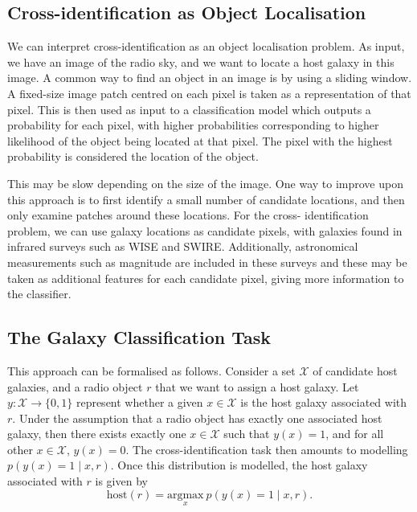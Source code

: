   \subsection{Cross-identification as Object Localisation}
  \label{sec:object-localisation}

    We can interpret cross-identification as an object localisation problem. As
    input, we have an image of the radio sky, and we want to locate a host
    galaxy in this image. A common way to find an object in an image is by using
    a sliding window. A fixed-size image patch centred on each pixel is taken as
    a representation of that pixel. This is then used as input to a
    classification model which outputs a probability for each pixel, with higher
    probabilities corresponding to higher likelihood of the object being located
    at that pixel. The pixel with the highest probability is considered the
    location of the object.

    This may be slow depending on the size of the image. One way to improve upon
    this approach is to first identify a small number of candidate locations,
    and then only examine patches around these locations. For the cross-
    identification problem, we can use galaxy locations as candidate pixels,
    with galaxies found in infrared surveys such as WISE and SWIRE.
    Additionally, astronomical measurements such as magnitude are included in
    these surveys and these may be taken as additional features for each
    candidate pixel, giving more information to the classifier.

  \subsection{The Galaxy Classification Task}
  \label{sec:galaxy-classification-task}


  This approach can be formalised as follows. Consider a set $\mathcal X$ of
  candidate host galaxies, and a radio object $r$ that we want to assign a
  host galaxy. Let $y : \mathcal X \to \{0, 1\}$ represent whether a given $x
  \in \mathcal X$ is the host galaxy associated with $r$. Under the assumption
  that a radio object has exactly one associated host galaxy, then there exists
  exactly one $x \in \mathcal X$ such that $y(x) = 1$, and for all other $x \in
  \mathcal X$, $y(x) = 0$. The cross-identification task then amounts to
  modelling $p(y(x) = 1 \mid x, r)$. Once this distribution is modelled, the
  host galaxy associated with $r$ is given by
  \begin{equation}
      \label{eq:cross-identification}
      \mbox{host}(r) = \underset{x}{\mbox{argmax}}\ p(y(x) = 1 \mid x, r).
  \end{equation}

